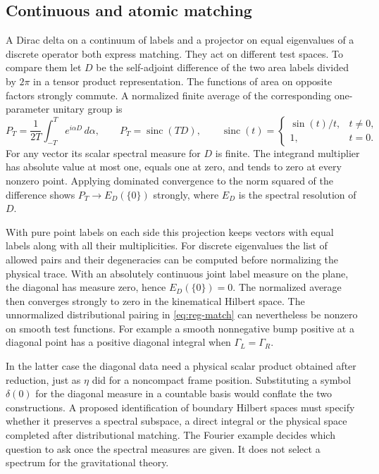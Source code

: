 \documentclass[11pt,letterpaper]{article}
\begin{document}
\subsection{Continuous and atomic matching}
A Dirac delta on a continuum of labels and a projector on equal eigenvalues of a discrete
operator both express matching. They act on different test spaces. To compare them let $D$ be
the self-adjoint difference of the two area labels divided by $2\pi$ in a tensor product
representation. The functions of area on opposite factors strongly commute. A normalized finite
average of the corresponding one-parameter unitary group is
\[
 P_T=\frac1{2T}\int_{-T}^{T}e^{i\alpha D}\,d\alpha,\qquad
 P_T=\operatorname{sinc}(TD),\qquad
 \operatorname{sinc}(t)=
 \begin{cases}\sin(t)/t,&t\ne0,\\1,&t=0.\end{cases}
\]
For any vector its scalar spectral measure for $D$ is finite. The integrand multiplier has
absolute value at most one, equals one at zero, and tends to zero at every nonzero point.
Applying dominated convergence to the norm squared of the difference shows $P_T\to E_D(\{0\})$
strongly, where $E_D$ is the spectral resolution of $D$.

With pure point labels on each side this projection keeps vectors with equal labels along with
all their multiplicities. For discrete eigenvalues the list of allowed pairs and their
degeneracies can be computed before normalizing the physical trace. With an absolutely
continuous joint label measure on the plane, the diagonal has measure zero, hence
$E_D(\{0\})=0$. The normalized average then converges strongly to zero in the kinematical
Hilbert space. The unnormalized distributional pairing in \eqref{eq:reg-match} can nevertheless
be nonzero on smooth test functions. For example a smooth nonnegative bump positive at a
diagonal point has a positive diagonal integral when $\Gamma_L=\Gamma_R$.

In the latter case the diagonal data need a physical scalar product obtained after reduction,
just as $\eta$ did for a noncompact frame position. Substituting a symbol $\delta(0)$ for the
diagonal measure in a countable basis would conflate the two constructions. A proposed
identification of boundary Hilbert spaces must specify whether it preserves a spectral
subspace, a direct integral or the physical space completed after distributional matching. The
Fourier example decides which question to ask once the spectral measures are given. It does not
select a spectrum for the gravitational theory.
\end{document}

